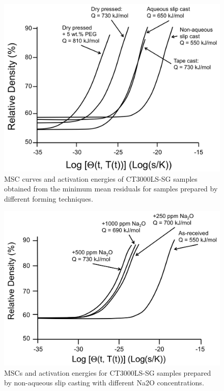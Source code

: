 \newpage
\begin{figure}[H]
	\centering
	\includegraphics[width=\textwidth]{Chapter-6/Figures/Figure11.png}
	\caption{MSC curves and activation energies of CT3000LS-SG samples obtained from the minimum mean residuals for samples prepared by different forming techniques.}
	\label{Ch6-figure:Figure11}
\end{figure}

\newpage
\begin{figure}[H]
	\centering
	\includegraphics[width=\textwidth]{Chapter-6/Figures/Figure12.png}
	\caption{MSCs and activation energies for CT3000LS-SG samples prepared by non-aqueous slip casting with different Na2O concentrations.}
	\label{Ch6-figure:Figure12}
\end{figure}

